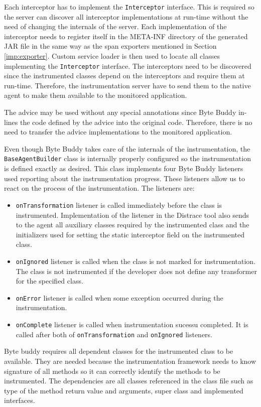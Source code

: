 Each interceptor has to implement the \texttt{Interceptor} interface. This is required so the server can discover all interceptor implementations at run-time without the need of changing the internals of the server. Each implementation of the interceptor needs to register itself in the META-INF directory of the generated JAR file in the same way as the span exporters mentioned in Section \ref{imp:exporter}. Custom service loader is then used to locate all classes implementing the \texttt{Interceptor} interface. The interceptors need to be discovered since the instrumented classes depend on the interceptors and require them at run-time. Therefore, the instrumentation server have to send them to the native agent to make them available to the monitored application.

The advice may be used without any special annotations since Byte Buddy in-lines the code defined by the advice into the original code. Therefore, there is no need to transfer the advice implementations to the monitored application.

Even though Byte Buddy takes care of the internals of the instrumentation, the \texttt{BaseAgentBuilder} class is internally properly configured so the instrumentation is defined exactly as desired. This class implements four Byte Buddy listeners used reporting about the instrumentation progress. These listeners allow us to react on the process of the instrumentation. The listeners are:
\begin{itemize}
	\item \texttt{onTransformation} listener is called immediately before the class is instrumented. Implementation of the listener in the Distrace tool also sends to the agent all auxiliary classes required by the instrumented class and the initializers used for setting the static interceptor field on the instrumented class.
	\item \texttt{onIgnored} listener is called when the class is not marked for instrumentation. The class is not instrumented if the developer does not define any transformer for the specified class.
	\item \texttt{onError} listener is called when some exception occurred during the instrumentation.
	\item \texttt{onComplete} listener is called when instrumentation sucessu completed. It is called after both of \texttt{onTransformation} and \texttt{onIgnored} listeners.
\end{itemize}

Byte buddy requires all dependent classes for the instrumented class to be available. They are needed because the instrumentation framework needs to know signature of all methods so it can correctly identify the methods to be instrumented. The dependencies are all classes referenced in the class file such as type of the method return value and arguments, super class and implemented interfaces. 

